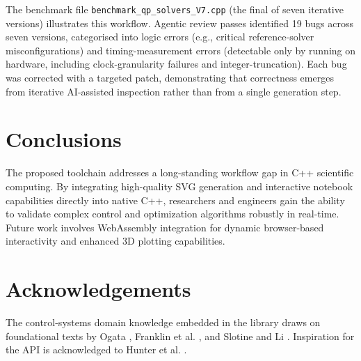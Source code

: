 \documentclass[preprint,12pt]{elsarticle}
\begin{document}
The benchmark file \texttt{benchmark\_qp\_solvers\_V7.cpp} (the final of seven iterative versions) illustrates this workflow. Agentic review passes identified 19 bugs across seven versions, categorised into logic errors (e.g., critical reference-solver misconfigurations) and timing-measurement errors (detectable only by running on hardware, including clock-granularity failures and integer-truncation). Each bug was corrected with a targeted patch, demonstrating that correctness emerges from iterative AI-assisted inspection rather than from a single generation step.

\section{Conclusions}
\label{sec:conclusions}
The proposed toolchain addresses a long-standing workflow gap in C++ scientific computing. By integrating high-quality SVG generation and interactive notebook capabilities directly into native C++, researchers and engineers gain the ability to validate complex control and optimization algorithms robustly in real-time. Future work involves WebAssembly integration for dynamic browser-based interactivity and enhanced 3D plotting capabilities.

\section*{Acknowledgements}
The control-systems domain knowledge embedded in the library draws on foundational texts by Ogata \cite{Ogata2010}, Franklin et al. \cite{Franklin2019}, and Slotine and Li \cite{Slotine1991}. Inspiration for the API is acknowledged to Hunter et al. \cite{Hunter2007}.



\end{document}
